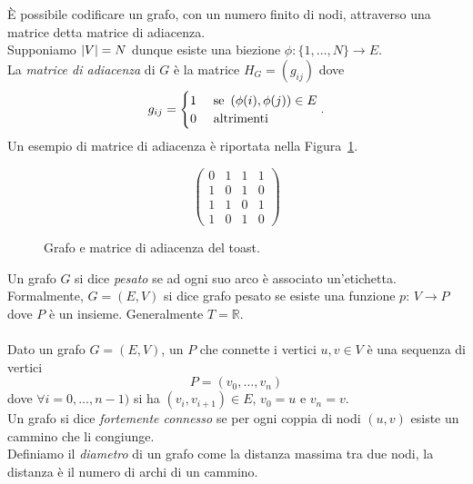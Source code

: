 \`E possibile codificare un grafo, con un numero finito di nodi, attraverso una matrice detta matrice di adiacenza.\\
Supponiamo $\left\vert V\right\vert=N$ dunque esiste una biezione $\phi:\{ 1, \dots, N\}\to E$.\\La \textit{matrice di adiacenza} di $G$ \`e la matrice $H_G=(g_{ij})$ dove 
$$ g_{ij}=\begin{cases}
1	& \text{ se } \left(  \phi(i), \phi(j) \right) \in E \\
0 &\text{ altrimenti } 
\end{cases}.$$
Un esempio di matrice di adiacenza \`e riportata nella Figura~\ref{fig::toast}.\\
\begin{figure}[!h]
\centering
\begin{minipage}{.45\textwidth}
\centering
\end{minipage}
\hfill
\begin{minipage}{.45\textwidth}
$$\begin{pmatrix} 0 & 1 & 1 & 1 \\ 1 & 0 & 1 & 0 \\ 1&1 & 0 & 1\\ 1& 0& 1& 0
\end{pmatrix}
$$
\end{minipage}
\caption{Grafo e matrice di adiacenza del toast.}
\label{fig::toast} 
\end{figure}
\newpage
Un grafo $G$ si dice \textit{pesato} se ad ogni suo arco \`e associato un'etichetta.\\
Formalmente, $G=(E,V)$ si dice grafo pesato se esiste una funzione $p:\, V \to P$ dove $P$ \`e un insieme. Generalmente $T=\mathbb{R}$.\\ \\
Dato un grafo $G=(E,V)$, un $P$ che connette i vertici $u,v\in V$ \`e una sequenza di vertici 
$$ P=\left( v_0, \dots, v_n\right) $$ 
dove $\forall i=0, \dots, n-1)$ si ha $(v_i, v_{i+1})\in E$, $v_0=u$ e  $v_n= v$.\\
Un grafo si dice \textit{fortemente connesso} se per ogni coppia di nodi $(u,v)$ esiste un cammino che li congiunge.\\
Definiamo il \textit{diametro} di un grafo come la distanza massima tra  due nodi, la distanza \`e il numero di archi di un cammino. 
\newpage


